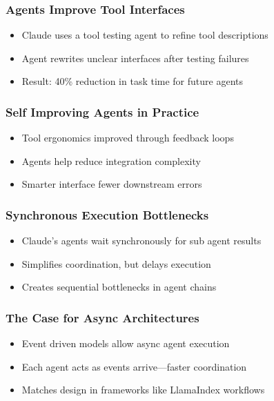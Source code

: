 \begin{frame}[fragile]\frametitle{Agents Improve Tool Interfaces}
    \begin{itemize}
        \item Claude uses a tool testing agent to refine tool descriptions
        \item Agent rewrites unclear interfaces after testing failures
        \item Result: 40\% reduction in task time for future agents
    \end{itemize}
\end{frame}

\begin{frame}[fragile]\frametitle{Self Improving Agents in Practice}
    \begin{itemize}
        \item Tool ergonomics improved through feedback loops
        \item Agents help reduce integration complexity
        \item Smarter interface   fewer downstream errors
    \end{itemize}
\end{frame}

\begin{frame}[fragile]\frametitle{Synchronous Execution   Bottlenecks}
    \begin{itemize}
        \item Claude's agents wait synchronously for sub agent results
        \item Simplifies coordination, but delays execution
        \item Creates sequential bottlenecks in agent chains
    \end{itemize}
\end{frame}

\begin{frame}[fragile]\frametitle{The Case for Async Architectures}
    \begin{itemize}
        \item Event driven models allow async agent execution
        \item Each agent acts as events arrive—faster coordination
        \item Matches design in frameworks like LlamaIndex workflows
    \end{itemize}
\end{frame}

